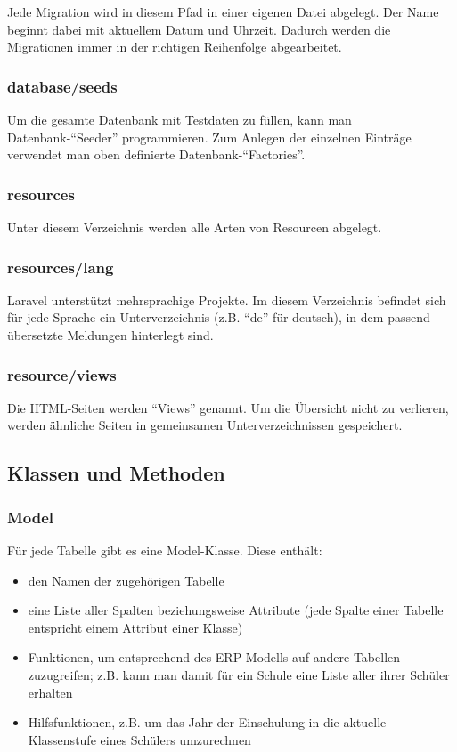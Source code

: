 Jede Migration wird in diesem Pfad in einer eigenen Datei abgelegt. Der Name beginnt dabei mit aktuellem Datum und Uhrzeit. Dadurch werden die Migrationen immer in der richtigen Reihenfolge abgearbeitet.

\subsubsection{database/seeds}

Um die gesamte Datenbank mit Testdaten zu füllen, kann man Datenbank-"`Seeder"' programmieren. Zum Anlegen der einzelnen Einträge verwendet man oben definierte Datenbank-"`Factories"'.

\subsubsection{resources}

Unter diesem Verzeichnis werden alle Arten von Resourcen abgelegt.

\subsubsection{resources/lang}

Laravel unterstützt mehrsprachige Projekte. Im diesem Verzeichnis befindet sich für jede Sprache ein Unterverzeichnis (z.B. "`de"' für deutsch), in dem passend übersetzte Meldungen hinterlegt sind.

\subsubsection{resource/views}

Die HTML-Seiten werden "`Views"' genannt. Um die Übersicht nicht zu verlieren, werden ähnliche Seiten in gemeinsamen Unterverzeichnissen gespeichert. 

\subsection{Klassen und Methoden}

\subsubsection{Model}

Für jede Tabelle gibt es eine Model-Klasse. Diese enthält:

  \begin{itemize}
  	\item den Namen der zugehörigen Tabelle
  	\item eine Liste aller Spalten beziehungsweise Attribute (jede Spalte einer Tabelle entspricht einem Attribut einer Klasse)
  	\item Funktionen, um entsprechend des ERP-Modells auf andere Tabellen zuzugreifen; z.B. kann man damit für ein Schule eine Liste aller ihrer Schüler erhalten
  	\item Hilfsfunktionen, z.B. um das Jahr der Einschulung in die aktuelle Klassenstufe eines Schülers umzurechnen
  \end{itemize}

